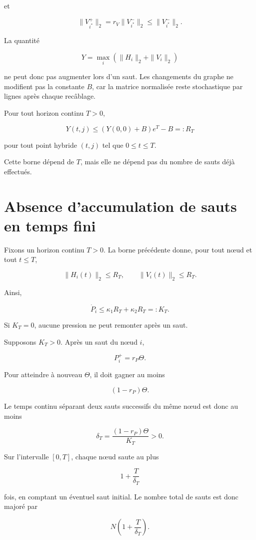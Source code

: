 et

\[
\|V_{i^\ast}^+\|_2
=
r_V\|V_{i^\ast}^-\|_2
\leq
\|V_{i^\ast}^-\|_2.
\]

La quantité

\[
Y
=
\max_i
\left(
\|H_i\|_2+\|V_i\|_2
\right)
\]

ne peut donc pas augmenter lors d'un saut. Les changements du graphe
ne modifient pas la constante \(B\), car la matrice normalisée reste
stochastique par lignes après chaque recâblage.

Pour tout horizon continu \(T>0\),

\[
\boxed{
Y(t,j)
\leq
\left(
Y(0,0)+B
\right)e^T-B
=:
R_T
}
\]

pour tout point hybride \((t,j)\) tel que \(0\leq t\leq T\).

Cette borne dépend de \(T\), mais elle ne dépend pas du nombre de
sauts déjà effectués.

\section{Absence d'accumulation de sauts en temps fini}
\label{annexe-existence-non-zenon}

Fixons un horizon continu \(T>0\). La borne précédente donne, pour
tout nœud et tout \(t\leq T\),

\[
\|H_i(t)\|_2\leq R_T,
\qquad
\|V_i(t)\|_2\leq R_T.
\]

Ainsi,

\[
\dot P_i
\leq
\kappa_1R_T+\kappa_2R_T
=:
K_T.
\]

Si \(K_T=0\), aucune pression ne peut remonter après un saut.

Supposons \(K_T>0\). Après un saut du nœud \(i\),

\[
P_i^+=r_P\Theta.
\]

Pour atteindre à nouveau \(\Theta\), il doit gagner au moins

\[
(1-r_P)\Theta.
\]

Le temps continu séparant deux sauts successifs du même nœud est donc
au moins

\[
\boxed{
\delta_T
=
\frac{(1-r_P)\Theta}{K_T}
>0.
}
\]

Sur l'intervalle \([0,T]\), chaque nœud saute au plus

\[
1+\frac{T}{\delta_T}
\]

fois, en comptant un éventuel saut initial. Le nombre total de sauts
est donc majoré par

\[
\boxed{
N\left(
1+\frac{T}{\delta_T}
\right).
}
\]

